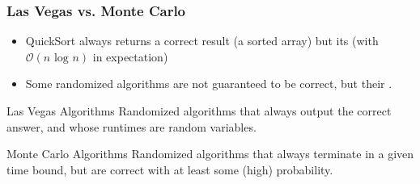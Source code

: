\documentclass[aspectratio=169]{beamer}
\begin{document}
\begin{frame}\frametitle{Las Vegas vs. Monte Carlo}

\begin{itemize}
  \item QuickSort always returns a \alert{correct result} (a sorted array) but its  (with $\mathcal{O}(n\text{ log }n)$ in expectation)
  \item Some randomized algorithms are \alert{not guaranteed to be correct}, but their .
\end{itemize}

\begin{block}{Las Vegas Algorithms}
Randomized algorithms that always output the correct answer, and whose runtimes are random variables.
\end{block}

\begin{alertblock}{Monte Carlo Algorithms}
Randomized algorithms that always terminate in a given time bound, but are correct with at least some (high) probability.
\end{alertblock}

\end{frame}


\end{document}
